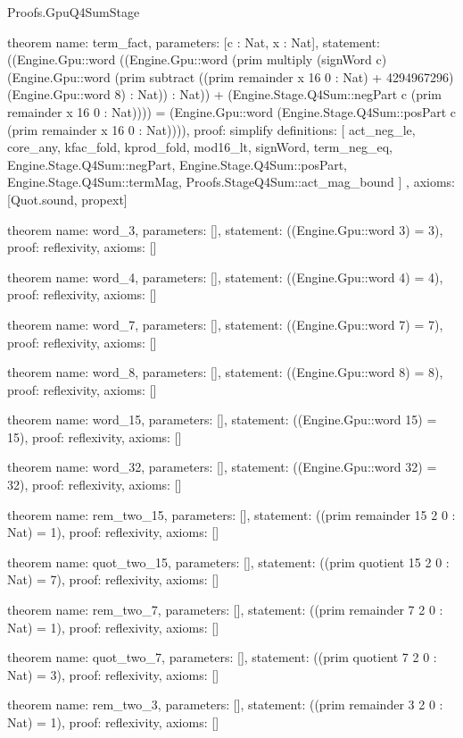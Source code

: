 \begin{lexlean}{Proofs.GpuQ4SumStage}
\begin{semanticmodule}
theorem{
  name: term_fact,
  parameters: [c : Nat, x : Nat],
  statement: ((Engine.Gpu::word ((Engine.Gpu::word (prim multiply (signWord c) (Engine.Gpu::word (prim subtract ((prim remainder x 16 0 : Nat) + 4294967296) (Engine.Gpu::word 8) : Nat)) : Nat)) + (Engine.Stage.Q4Sum::negPart c (prim remainder x 16 0 : Nat)))) = (Engine.Gpu::word (Engine.Stage.Q4Sum::posPart c (prim remainder x 16 0 : Nat)))),
  proof: simplify{
    definitions: [
      act_neg_le,
      core_any,
      kfac_fold,
      kprod_fold,
      mod16_lt,
      signWord,
      term_neg_eq,
      Engine.Stage.Q4Sum::negPart,
      Engine.Stage.Q4Sum::posPart,
      Engine.Stage.Q4Sum::termMag,
      Proofs.StageQ4Sum::act_mag_bound
    ]
  },
  axioms: [Quot.sound, propext]
}

theorem{
  name: word_3,
  parameters: [],
  statement: ((Engine.Gpu::word 3) = 3),
  proof: reflexivity{},
  axioms: []
}

theorem{
  name: word_4,
  parameters: [],
  statement: ((Engine.Gpu::word 4) = 4),
  proof: reflexivity{},
  axioms: []
}

theorem{
  name: word_7,
  parameters: [],
  statement: ((Engine.Gpu::word 7) = 7),
  proof: reflexivity{},
  axioms: []
}

theorem{
  name: word_8,
  parameters: [],
  statement: ((Engine.Gpu::word 8) = 8),
  proof: reflexivity{},
  axioms: []
}

theorem{
  name: word_15,
  parameters: [],
  statement: ((Engine.Gpu::word 15) = 15),
  proof: reflexivity{},
  axioms: []
}

theorem{
  name: word_32,
  parameters: [],
  statement: ((Engine.Gpu::word 32) = 32),
  proof: reflexivity{},
  axioms: []
}

theorem{
  name: rem_two_15,
  parameters: [],
  statement: ((prim remainder 15 2 0 : Nat) = 1),
  proof: reflexivity{},
  axioms: []
}

theorem{
  name: quot_two_15,
  parameters: [],
  statement: ((prim quotient 15 2 0 : Nat) = 7),
  proof: reflexivity{},
  axioms: []
}

theorem{
  name: rem_two_7,
  parameters: [],
  statement: ((prim remainder 7 2 0 : Nat) = 1),
  proof: reflexivity{},
  axioms: []
}

theorem{
  name: quot_two_7,
  parameters: [],
  statement: ((prim quotient 7 2 0 : Nat) = 3),
  proof: reflexivity{},
  axioms: []
}

theorem{
  name: rem_two_3,
  parameters: [],
  statement: ((prim remainder 3 2 0 : Nat) = 1),
  proof: reflexivity{},
  axioms: []
}


\end{semanticmodule}
\end{lexlean}
